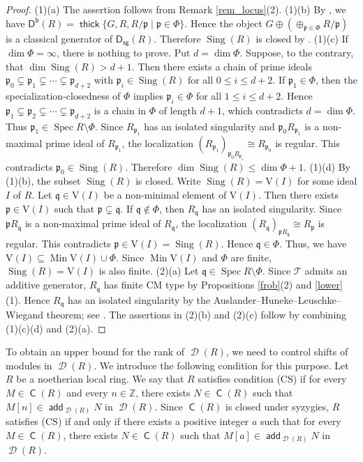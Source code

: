 \documentclass[10pt]{amsart}
\theoremstyle{definition}
\theoremstyle{remark}
\numberwithin{equation}{thm}
\def\add{\operatorname{\mathsf{add}}}
\def\c{\operatorname{\mathsf{C}}}
\def\d{\operatorname{\mathscr{D}}}
\def\db{\operatorname{\mathsf{D^b}}}
\def\dim{\operatorname{dim}}
\def\ds{\operatorname{\mathsf{D_{sg}}}}
\def\le{\leqslant}
\def\Min{\operatorname{Min}}
\def\p{\mathfrak{p}}
\def\q{\mathfrak{q}}
\def\Sing{\operatorname{Sing}}
\def\Spec{\operatorname{Spec}}
\def\T{\mathcal{T}}
\def\thick{\operatorname{\mathsf{thick}}}
\def\V{\mathrm{V}}
\def\ZZ{\mathbb{Z}}
\begin{document}
\begin{proof}
(1)(a) The assertion follows from Remark \ref{rem_locus}(2).
(1)(b) By \cite[Lemma 7.5(1)]{T2017}, we have $\db(R)=\thick\{G,R,R/\p\mid\p\in\Phi\}$. 
Hence the object $G\oplus (\oplus_{\p\in\Phi}R/\p)$ is a classical generator of $\ds(R)$. 
Therefore $\Sing(R)$ is closed by \cite[Lemma 2.9]{IT2019}.
(1)(c) If $\dim\Phi=\infty$, there is nothing to prove. 
Put $d=\dim\Phi$. 
Suppose, to the contrary, that $\dim\Sing(R)>d+1$. 
Then there exists a chain of prime ideals $\p_0\subsetneq\p_1\subsetneq\cdots\subsetneq\p_{d+2}$ with $\p_i\in\Sing(R)$ for all $0\le i\le d+2$. 
If $\p_1\in\Phi$, then the specialization-closedness of $\Phi$ implies $\p_i\in\Phi$ for all $1\le i\le d+2$.
Hence $\p_1\subsetneq\p_2\subsetneq\cdots\subsetneq\p_{d+2}$ is a chain in $\Phi$ of length $d+1$, which contradicts $d=\dim\Phi$. 
Thus $\p_1\in\Spec R\setminus\Phi$. 
Since $R_{\p_1}$ has an isolated singularity and $\p_0R_{\p_1}$ is a non-maximal prime ideal of $R_{\p_1}$, the localization $(R_{\p_1})_{\p_0R_{\p_1}}\cong R_{\p_0}$ is regular.
This contradicts $\p_0\in\Sing(R)$. 
Therefore $\dim\Sing(R)\le \dim\Phi+1$.
(1)(d) By (1)(b), the subset $\Sing(R)$ is closed. 
Write $\Sing(R)=\V(I)$ for some ideal $I$ of $R$. 
Let $\q\in\V(I)$ be a non-minimal element of $\V(I)$. 
Then there exists $\p\in\V(I)$ such that $\p\subsetneq\q$. If $\q\notin\Phi$, then $R_{\q}$ has an isolated singularity. 
Since $\p R_{\q}$ is a non-maximal prime ideal of $R_{\q}$, the localization $(R_{\q})_{\p R_{\q}}\cong R_{\p}$ is regular. 
This contradicts $\p\in\V(I)=\Sing(R)$. 
Hence $\q\in\Phi$. 
Thus, we have $\V(I)\subseteq \Min\V(I)\cup\Phi$. 
Since $\Min\V(I)$ and $\Phi$ are finite, $\Sing(R)=\V(I)$ is also finite.
(2)(a) Let $\q\in\Spec R\setminus\Phi$. 
Since $\T$ admits an additive generator, $R_{\q}$ has finite CM type by Propositions \ref{frob}(2) and \ref{lower}(1).
Hence $R_{\q}$ has an isolated singularity by the Auslander--Huneke--Leuschke--Wiegand theorem; see \cite[Theorem 6.12]{LW}.
The assertions in (2)(b) and (2)(c) follow by combining (1)(c)(d) and (2)(a).
\end{proof}
To obtain an upper bound for the rank of $\d(R)$, we need to control shifts of modules in $\d(R)$. 
We introduce the following condition for this purpose.
Let $R$ be a noetherian local ring.
We say that $R$ satisfies condition ($\mathrm{CS}$) if for every $M\in\c(R)$ and every $n\in\ZZ$, there exists $N\in\c(R)$ such that $M[n]\in\add_{\d(R)}N$ in $\d(R)$.
Since $\c(R)$ is closed under syzygies, $R$ satisfies ($\mathrm{CS}$) if and only if there exists a positive integer $a$ such that for every $M\in\c(R)$, there exists $N\in\c(R)$ such that $M[a]\in\add_{\d(R)}N$ in $\d(R)$.
\end{document}
